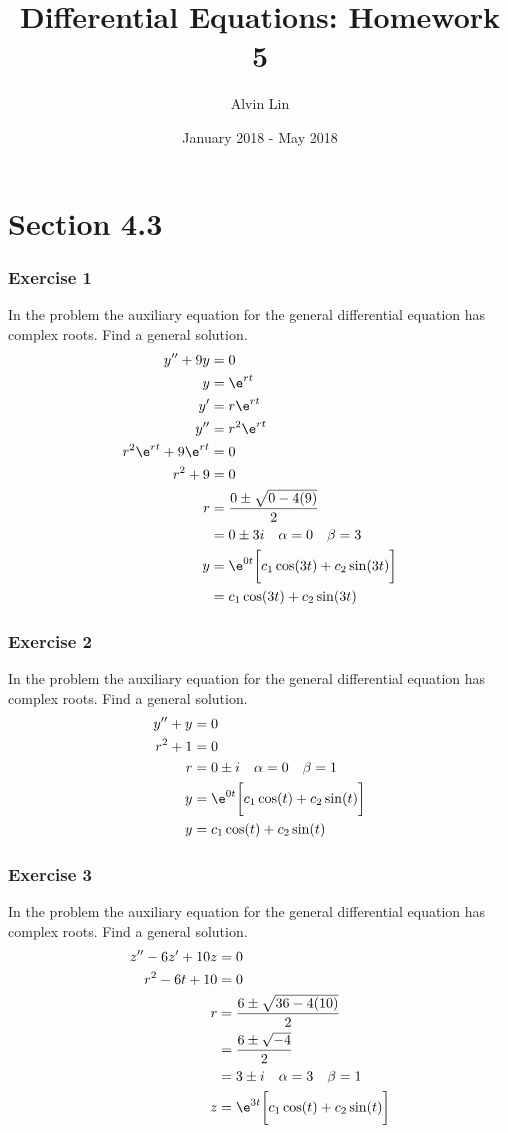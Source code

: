 \documentclass{math}
\title{Differential Equations: Homework 5}
\author{Alvin Lin}
\date{January 2018 - May 2018}
\begin{document}
\maketitle
\clearpage

\section*{Section 4.3}

\subsubsection*{Exercise 1}
In the problem the auxiliary equation for the general differential equation has
complex roots. Find a general solution.
\begin{align*}
  y''+9y &= 0 \\
  y &= \e^{rt} \\
  y' &= r\e^{rt} \\
  y'' &= r^2\e^{rt} \\
  r^2\e^{rt}+9\e^{rt} &= 0 \\
  r^2+9 &= 0 \\
  r &= \frac{0\pm\sqrt{0-4(9)}}{2} \\
  &= 0\pm3i \quad \alpha = 0 \quad \beta = 3 \\
  y &= \e^{0t}\bigg[c_1\cos(3t)+c_2\sin(3t)\bigg] \\
  &= c_1\cos(3t)+c_2\sin(3t)
\end{align*}

\subsubsection*{Exercise 2}
In the problem the auxiliary equation for the general differential equation has
complex roots. Find a general solution.
\begin{align*}
  y''+y &= 0 \\
  r^2+1 &= 0 \\
  r &= 0\pm i \quad \alpha = 0 \quad \beta = 1 \\
  y &= \e^{0t}\bigg[c_1\cos(t)+c_2\sin(t)\bigg] \\
  y &= c_1\cos(t)+c_2\sin(t)
\end{align*}

\subsubsection*{Exercise 3}
In the problem the auxiliary equation for the general differential equation has
complex roots. Find a general solution.
\begin{align*}
  z''-6z'+10z &= 0 \\
  r^2-6t+10 &= 0 \\
  r &= \frac{6\pm\sqrt{36-4(10)}}{2} \\
  &= \frac{6\pm\sqrt{-4}}{2} \\
  &= 3\pm i \quad \alpha = 3 \quad \beta = 1 \\
  z &= \e^{3t}\bigg[c_1\cos(t)+c_2\sin(t)\bigg]
\end{align*}
\end{document}
